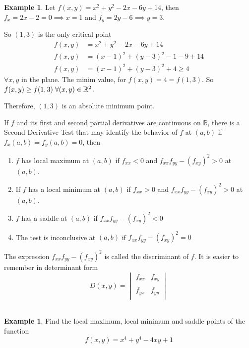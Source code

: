 \documentclass[11pt,a4paper]{article}
\theoremstyle{definition}
\newtheorem{exa}[thm]{Example}
\begin{document}
\begin{exa}


Let $f(x,y) = x^2 + y^2 -2x - 6y + 14$, then $f_x = 2x - 2 = 0 \implies x = 1$ and $f_y = 2y - 6 \implies y = 3$.


So $(1,3)$ is the only critical point 
\begin{align*}
f(x,y) & = x^2 + y^2 - 2x - 6y + 14\\
f(x,y) & = (x - 1)^2 + (y - 3)^2 - 1 - 9 + 14\\
f(x,y) & = (x - 1)^2 + (y - 3)^2 + 4\geq 4
\end{align*}
$\forall x, y $ in the plane. The minim value, for $f(x,y) = 4 = f(1,3)$. So $f(x,y) \geq f(1,3)\hspace{0.1cm} \forall (x,y) \in \mathbb{R}^2$.


Therefore, $(1,3)$ is an absolute minimum point.


\pagebreak
If $f$ and its first and second partial derivatives are continuous on $\mathbb{R}$, there is a Second Derivative Test that may identify the behavior of $f$ at $(a,b)$ if $f_x(a,b) = f_y(a,b) = 0$, then 
\begin{enumerate}
\item $f$ has local maximum at $(a,b)$ if $f_{xx}< 0$ and $f_{xx}f_{yy} - (f_{xy})^2 >0$ at $(a,b)$.
\item If $f$ has a local minimum at $(a,b)$ if $f_{xx}>0$ and $f_{xx}f_{yy} - (f_{xy})^2> 0$ at $(a,b)$.
\item $f$ has a saddle  at $(a,b)$ if $f_{xx}f_{yy} - (f_{xy})^2< 0$
\item The test is inconclusive at $(a,b)$ if $f_{xx}f_{yy} - (f_{xy})^2 =0$
\end{enumerate}

The expression $f_{xx}f_{yy} - (f_{xy})^2$ is called the discriminant of $f$. It is easier to remember in determinant form $$D(x,y) = \begin{vmatrix}
f_{xx} & f_{xy}\\\\
f_{yx} & f_{yy}\\
\end{vmatrix}$$\\
\end{exa}

\begin{exa}


Find the local maximum, local minimum and saddle points of the function $$f(x,y) = x^4 + y^4 - 4xy + 1$$
\end{exa}
\end{document}
